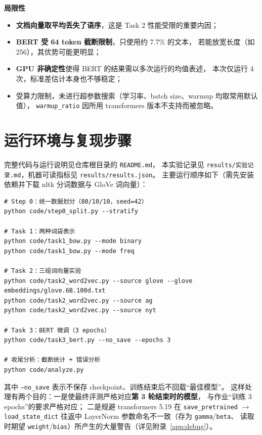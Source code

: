 \documentclass[12pt,a4paper]{ctexart}
\newcommand{\fpath}[1]{\texttt{#1}}
\begin{document}
\textbf{局限性}

\begin{itemize}
  \item \textbf{文档向量取平均丢失了语序}，这是 Task 2 性能受限的重要内因；
  \item \textbf{BERT 受 64 token 截断限制}，只使用约 7.7\% 的文本，
        若能放宽长度（如 256），其优势可能更明显；
  \item \textbf{GPU 非确定性}使得 BERT 的结果需以多次运行的均值表述，
        本次仅运行 4 次，标准差估计本身也不够稳定；
  \item 受算力限制，未进行超参数搜索（学习率、batch size、warmup 均取常用默认值），
        \fpath{warmup\_ratio} 因所用 transformers 版本不支持而被忽略。
\end{itemize}

\appendix

\section{运行环境与复现步骤}

完整代码与运行说明见仓库根目录的 \fpath{README.md}，
本实验记录见 \fpath{results/实验记录.md}，机器可读指标见 \fpath{results/results.json}。
主要运行顺序如下（需先安装依赖并下载 nltk 分词数据与 GloVe 词向量）：

{\small
\begin{verbatim}
# Step 0：统一数据划分（80/10/10，seed=42）
python code/step0_split.py --stratify

# Task 1：两种词袋表示
python code/task1_bow.py --mode binary
python code/task1_bow.py --mode freq

# Task 2：三组词向量实验
python code/task2_word2vec.py --source glove --glove embeddings/glove.6B.100d.txt
python code/task2_word2vec.py --source ag
python code/task2_word2vec.py --source nyt

# Task 3：BERT 微调（3 epochs）
python code/task3_bert.py --no_save --epochs 3

# 收尾分析：截断统计 + 错误分析
python code/analyze.py
\end{verbatim}
}

其中 \fpath{--no\_save} 表示不保存 checkpoint、训练结束后不回载``最佳模型''。
这样处理有两个目的：一是使最终评测严格对应\textbf{第 3 轮结束时的模型}，
与作业``训练 3 epochs''的要求严格对应；
二是规避 transformers 5.19 在 \fpath{save\_pretrained} $\to$ \fpath{load\_state\_dict}
往返中 LayerNorm 参数命名不一致（存为 \fpath{gamma}/\fpath{beta}、
读取时期望 \fpath{weight}/\fpath{bias}）所产生的大量警告（详见附录~\ref{app:debug}）。
\end{document}
